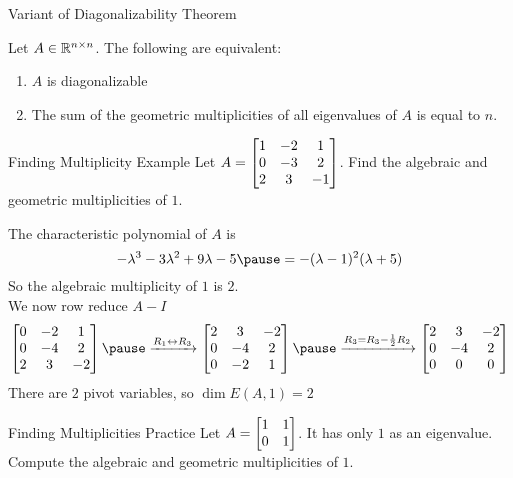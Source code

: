 \documentclass[xcoler=dvipsnames, aspectratio=169]{beamer}
\begin{document}
    \begin{frame}{Variant of Diagonalizability Theorem}
        \begin{theorem}
            Let $A\in\mathbb{R}^{n\times  n}$. The following are equivalent:
            \begin{enumerate}
                \pause\item $A$ is diagonalizable
                \pause\item The sum of the geometric multiplicities of all eigenvalues of $A$ is equal to $n$.
            \end{enumerate}
        \end{theorem}
    \end{frame}
    \begin{frame}{Finding Multiplicity Example}
        Let $A = \begin{bmatrix}
            1 &-2 & 1\\
            0 &-3 & 2\\
            2 & 3 &-1
        \end{bmatrix}$. Find the algebraic and geometric multiplicities of $1$.
        \pause

        The characteristic polynomial of $A$ is
        \[
            -\lambda^3 - 3\lambda^2 + 9\lambda -5\pause = -(\lambda-1)^2(\lambda+5)
        \]\pause
        So the algebraic multiplicity of $1$ is $2$.\pause\\
        We now row reduce $A-I$\pause
        \[
            \bMat{
                0 &-2 & 1\\
                0 &-4 & 2\\
                2 & 3 &-2
            }\pause\xrightarrow{R_1\leftrightarrow R_3}\bMat{
                2 & 3 &-2\\
                0 &-4 & 2\\
                0 &-2 & 1
            }\pause\xrightarrow{R_3=R_3-\frac{1}{2}R_2}\bMat{
                2 & 3 &-2\\
                0 &-4 & 2\\
                0 & 0 & 0

            }
        \]\pause
        There are $2$ pivot variables, so $\dim{E(A,1)}=2$ 


    \end{frame}
    \begin{frame}{Finding Multiplicities Practice}
        Let $A=\begin{bmatrix}1&1\\0&1\end{bmatrix}$. It has only $1$ as an eigenvalue. Compute the algebraic
        and geometric multiplicities of $1$.
    \end{frame}
\end{document}
